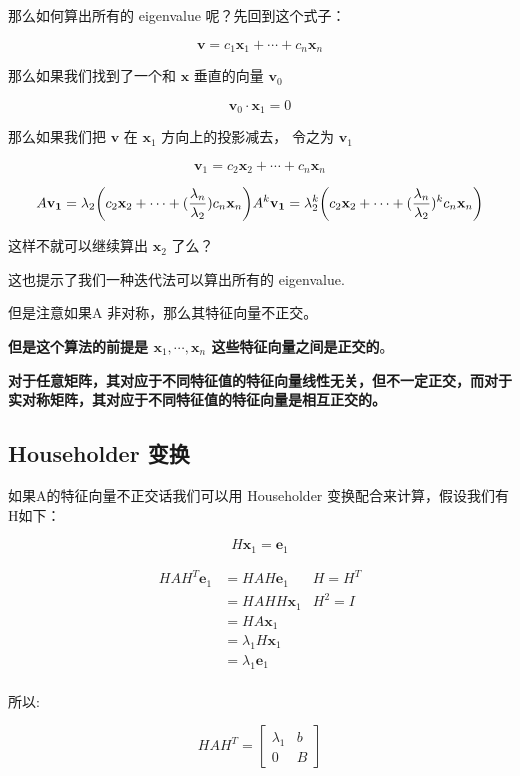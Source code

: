 \documentclass[
]{book}
\begin{document}
那么如何算出所有的 eigenvalue 呢？先回到这个式子：

\[\mathbf{v} = c_1 \mathbf{x}_1 + \cdots + c_n\mathbf{x}_n\]

那么如果我们找到了一个和 \(\mathbf{x}\) 垂直的向量 \(\mathbf{v}_0\)

\[\mathbf{v}_0\cdot \mathbf{x}_1 = 0\]

那么如果我们把 \(\mathbf{v}\) 在 \(\mathbf{x}_1\) 方向上的投影减去， 令之为 \(\mathbf{v}_1\)

\[\mathbf{v}_1 = c_2 \mathbf{x}_2 + \cdots + c_n\mathbf{x}_n\]

\[A\mathbf{v_1} = \lambda_2 \bigg( c_2 \mathbf{x}_2 + \cdots + (\frac{\lambda_n}{\lambda_2})  c_n\mathbf{x}_n \bigg)\\
A^k\mathbf{v_1} = \lambda_2^k \bigg( c_2 \mathbf{x}_2 + \cdots + (\frac{\lambda_n}{\lambda_2})^k  c_n\mathbf{x}_n \bigg)\]

这样不就可以继续算出 \(\mathbf{x}_2\) 了么？

这也提示了我们一种迭代法可以算出所有的 eigenvalue.

但是注意如果A 非对称，那么其特征向量不正交。

\textbf{但是这个算法的前提是 \(\mathbf{x}_1, \cdots, \mathbf{x}_n\) 这些特征向量之间是正交的}。

\textbf{对于任意矩阵，其对应于不同特征值的特征向量线性无关，但不一定正交，而对于实对称矩阵，其对应于不同特征值的特征向量是相互正交的。}

\hypertarget{householder-ux53d8ux6362}{%
\subsection{Householder 变换}\label{householder-ux53d8ux6362}}

如果A的特征向量不正交话我们可以用 Householder 变换配合来计算，假设我们有H如下：

\[H\mathbf{x}_1 = \mathbf{e}_1\]

\[
\begin{aligned}
HAH^T\mathbf{e}_1 {}
&= HAH\mathbf{e}_1 &H = H^T\\
&= HAHH\mathbf{x}_1 &H^2=I\\
&= HA\mathbf{x}_1 \\
&= \lambda_1H\mathbf{x}_1 \\
&= \lambda_1\mathbf{e}_1 \\
\end{aligned}
\]

所以:

\[
HAH^T = \begin{bmatrix}
\lambda_1 & b \\
0 & B
\end{bmatrix}
\]
\end{document}
